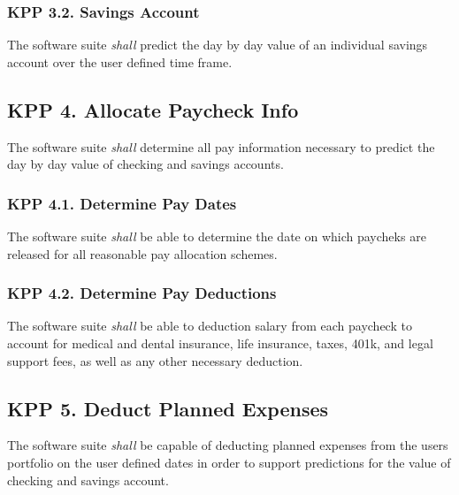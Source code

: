 \subsubsection{KPP 3.2. Savings Account}
The software suite {\textit{shall}} predict the day by day value of an individual
savings account over the user defined time frame.

\subsection{KPP 4. Allocate Paycheck Info}
The software suite {\textit{shall}} determine all pay information necessary to
predict the day by day value of checking and savings accounts.

\subsubsection{KPP 4.1. Determine Pay Dates}
The software suite {\textit{shall}} be able to determine the date on which
paycheks are released for all reasonable pay allocation schemes.

\subsubsection{KPP 4.2. Determine Pay Deductions}
The software suite {\textit{shall}} be able to deduction salary from each paycheck
to account for medical and dental insurance, life insurance, taxes, 401k, and legal
support fees, as well as any other necessary deduction.

\subsection{KPP 5. Deduct Planned Expenses}
The software suite {\textit{shall}} be capable of deducting planned expenses
from the users portfolio on the user defined dates in order to support predictions
for the value of checking and savings account.

